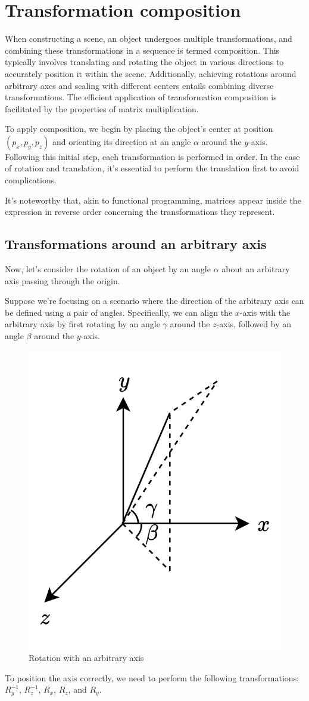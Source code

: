 \section{Transformation composition}

When constructing a scene, an object undergoes multiple transformations, and combining these transformations in a sequence is termed composition.
This typically involves translating and rotating the object in various directions to accurately position it within the scene.
Additionally, achieving rotations around arbitrary axes and scaling with different centers entails combining diverse transformations.
The efficient application of transformation composition is facilitated by the properties of matrix multiplication.

To apply composition, we begin by placing the object's center at position $(p_x, p_y, p_z)$ and orienting its direction at an angle $\alpha$ around the $y$-axis.
Following this initial step, each transformation is performed in order. 
In the case of rotation and translation, it's essential to perform the translation first to avoid complications.

It's noteworthy that, akin to functional programming, matrices appear inside the expression in reverse order concerning the transformations they represent.

\subsection{Transformations around an arbitrary axis}
Now, let's consider the rotation of an object by an angle $\alpha$ about an arbitrary axis passing through the origin.

Suppose we're focusing on a scenario where the direction of the arbitrary axis can be defined using a pair of angles.
Specifically, we can align the $x$-axis with the arbitrary axis by first rotating by an angle $\gamma$ around the $z$-axis, followed by an angle $\beta$ around the $y$-axis.
\begin{figure}[H]
    \centering
    \includegraphics[width=0.25\linewidth]{images/rotationaxis.png}
    \caption{Rotation with an arbitrary axis}
\end{figure}
To position the axis correctly, we need to perform the following transformations: $R^{-1}_y$, $R^{-1}_z$, $R_x$, $R_z$, and $R_y$.

